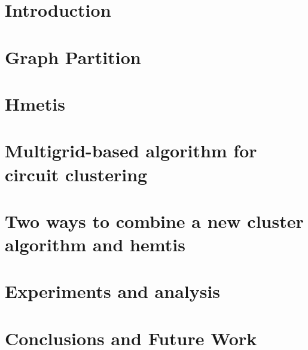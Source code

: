 \documentclass[12pt,oneside]{book}
\theoremstyle{plain}
\theoremstyle{definition}
\newcommand{\newchapter}[2] { \newpage \chapter{#1} \label{chap:#2}  }
\begin{document}
\newpage



\newpage

\tableofcontents
\listoffigures
\listoftables

\mainmatter

\fontsize{11}{20pt} \selectfont

\newchapter{Introduction}{introduction}
\newchapter{Graph Partition}{chapter1}
\newchapter{Hmetis}{chapter2}
\newchapter{Multigrid-based algorithm for circuit clustering}{chapter3}
\newchapter{Two ways to combine a new cluster algorithm and hemtis}{chapter4}
\newchapter{Experiments and analysis}{chapter5}
\newchapter{Conclusions and Future Work}{chapter6}




\fontsize{11}{11pt} \selectfont



\end{document}
